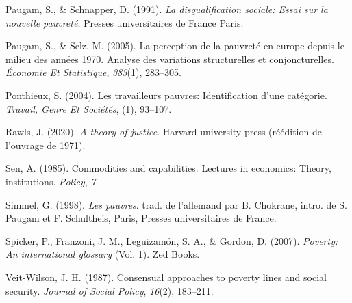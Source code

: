 \documentclass[12pt,a4paper]{reedthesis}
\newenvironment{CSLReferences}%
  {}%
  {\par}
\begin{document}
\begin{CSLReferences}{1}{0}
\leavevmode\hypertarget{ref-paugam1991disqualification}{}%
Paugam, S., \& Schnapper, D. (1991). \emph{La disqualification sociale: Essai sur la nouvelle pauvret{é}}. Presses universitaires de France Paris.

\leavevmode\hypertarget{ref-paugam2005perception}{}%
Paugam, S., \& Selz, M. (2005). La perception de la pauvret{é} en europe depuis le milieu des ann{é}es 1970. Analyse des variations structurelles et conjoncturelles. \emph{{É}conomie Et Statistique}, \emph{383}(1), 283--305.

\leavevmode\hypertarget{ref-ponthieux2004travailleurs}{}%
Ponthieux, S. (2004). Les travailleurs pauvres: Identification d'une cat{é}gorie. \emph{Travail, Genre Et Soci{é}t{é}s}, (1), 93--107.

\leavevmode\hypertarget{ref-rawls2020theory}{}%
Rawls, J. (2020). \emph{A theory of justice}. Harvard university press (réédition de l'ouvrage de 1971).

\leavevmode\hypertarget{ref-sen1985commodities}{}%
Sen, A. (1985). Commodities and capabilities. Lectures in economics: Theory, institutions. \emph{Policy}, \emph{7}.

\leavevmode\hypertarget{ref-simmel2011pauvres}{}%
Simmel, G. (1998). \emph{Les pauvres}. trad. de l'allemand par B. Chokrane, intro. de S. Paugam et F. Schultheis, Paris, Presses universitaires de France.

\leavevmode\hypertarget{ref-spicker2007poverty}{}%
Spicker, P., Franzoni, J. M., Leguizamón, S. A., \& Gordon, D. (2007). \emph{Poverty: An international glossary} (Vol. 1). Zed Books.

\leavevmode\hypertarget{ref-veit1987consensual}{}%
Veit-Wilson, J. H. (1987). Consensual approaches to poverty lines and social security. \emph{Journal of Social Policy}, \emph{16}(2), 183--211.

\end{CSLReferences}

\newpage
\thispagestyle{empty}
\selectfont

\lhead{}
\rhead{}
\rfoot{}
\cfoot{}
\lfoot{}
\end{document}
